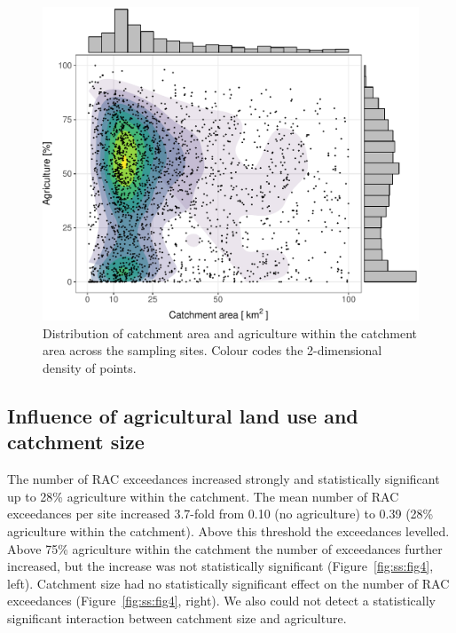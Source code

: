 \begin{figure}[ht]
  \includegraphics[width=\textwidth]{chapters/smallstreams/figure3.pdf}
  \caption[Distribution of catchment area and agriculture within the catchment area across the sampling sites.]{Distribution of catchment area and agriculture within the catchment area across the sampling sites.
  Colour codes the 2-dimensional density of points.}
  \label{fig:ss:fig3}
\end{figure}


\subsection{Influence of agricultural land use and catchment size}
The number of RAC exceedances increased strongly and statistically significant up to 28\% agriculture within the catchment.
The mean number of RAC exceedances per site increased 3.7-fold from 0.10 (no agriculture) to 0.39 (28\% agriculture within the catchment). 
Above this threshold the exceedances levelled.
Above 75\% agriculture within the catchment the number of exceedances further increased, but the increase was not statistically significant (Figure~\ref{fig:ss:fig4}, left). 
Catchment size had no statistically significant effect on the number of RAC exceedances (Figure~\ref{fig:ss:fig4}, right).
We also could not detect a statistically significant interaction between catchment size and agriculture. 

